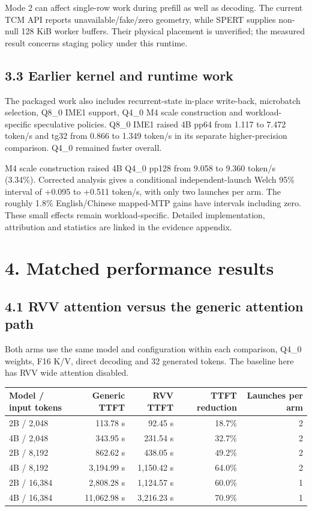 \documentclass[10pt,a4paper]{article}
\begin{document}
Mode 2 can affect single-row work during prefill as well as decoding.
The current TCM API reports unavailable/fake/zero geometry, while SPERT
supplies non-null 128 KiB worker buffers. Their physical placement is
unverified; the measured result concerns staging policy under this
runtime.

\hypertarget{earlier-kernel-and-runtime-work}{%
\subsection{3.3 Earlier kernel and runtime
work}\label{earlier-kernel-and-runtime-work}}

The packaged work also includes recurrent-state in-place write-back,
microbatch selection, Q8\_0 IME1 support, Q4\_0 M4 scale construction
and workload-specific speculative policies. Q8\_0 IME1 raised 4B pp64
from 1.117 to 7.472 token/s and tg32 from 0.866 to 1.349 token/s in its
separate higher-precision comparison. Q4\_0 remained faster overall.

M4 scale construction raised 4B Q4\_0 pp128 from 9.058 to 9.360 token/s
(3.34\%). Corrected analysis gives a conditional independent-launch
Welch 95\% interval of +0.095 to +0.511 token/s, with only two launches
per arm. The roughly 1.8\% English/Chinese mapped-MTP gains have
intervals including zero. These small effects remain workload-specific.
Detailed implementation, attribution and statistics are linked in the
evidence appendix.

\hypertarget{matched-performance-results}{%
\section{4. Matched performance
results}\label{matched-performance-results}}

\hypertarget{rvv-attention-versus-the-generic-attention-path}{%
\subsection{4.1 RVV attention versus the generic attention
path}\label{rvv-attention-versus-the-generic-attention-path}}

Both arms use the same model and configuration within each comparison,
Q4\_0 weights, F16 K/V, direct decoding and 32 generated tokens. The
baseline here has RVV wide attention disabled.

\begin{longtable}[]{@{}lrrrr@{}}
\toprule
Model / input tokens & Generic TTFT & RVV TTFT & TTFT reduction &
Launches per arm\tabularnewline
\midrule
\endhead
2B / 2,048 & 113.78 s & 92.45 s & 18.7\% & 2\tabularnewline
4B / 2,048 & 343.95 s & 231.54 s & 32.7\% & 2\tabularnewline
2B / 8,192 & 862.62 s & 438.05 s & 49.2\% & 2\tabularnewline
4B / 8,192 & 3,194.99 s & 1,150.42 s & 64.0\% & 2\tabularnewline
2B / 16,384 & 2,808.28 s & 1,124.57 s & 60.0\% & 1\tabularnewline
4B / 16,384 & 11,062.98 s & 3,216.23 s & 70.9\% & 1\tabularnewline
\bottomrule
\end{longtable}
\end{document}

